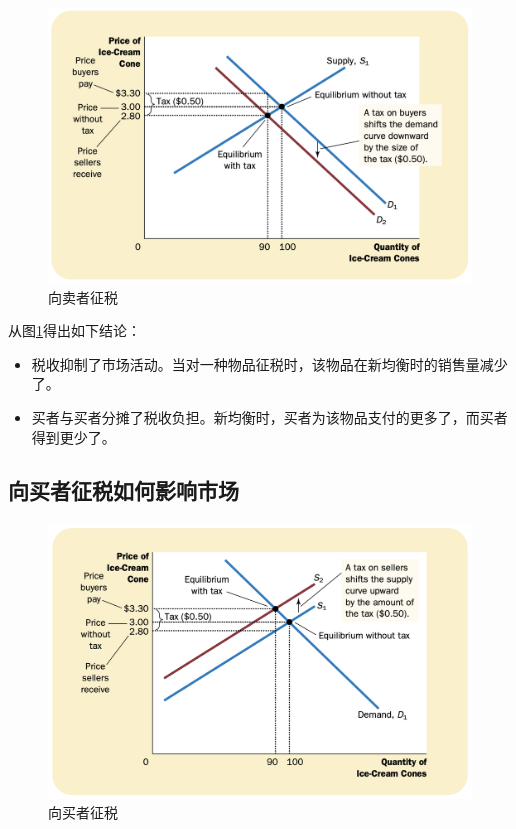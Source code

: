 \begin{figure}[!ht]
  \centering
  \includegraphics[width=\textwidth]{pics/tax1}
  \caption{向卖者征税}
  \label{fig:tax1}
\end{figure}


从图\ref{fig:tax1}得出如下结论：
\begin{itemize}
\item 税收抑制了市场活动。当对一种物品征税时，该物品在新均衡时的销售量减少了。
\item 买者与买者分摊了税收负担。新均衡时，买者为该物品支付的更多了，而买者得到更少了。
\end{itemize}




\subsection{向买者征税如何影响市场}


\begin{figure}[!ht]
  \centering
  \includegraphics[width=\textwidth]{pics/tax2}
  \caption{向买者征税}
  \label{fig:tax2}
\end{figure}


